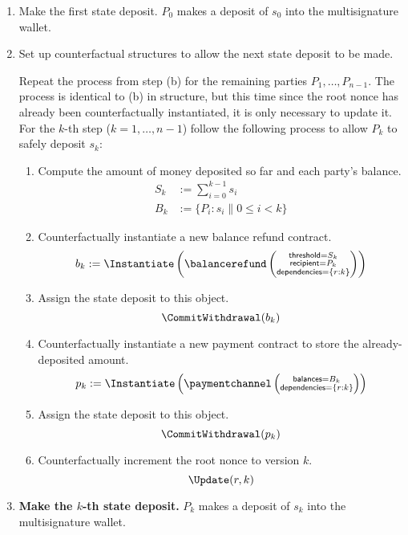 \documentclass[prb,floatfix,reprint,nofootinbib,amsmath,amssymb,epsfig,pre,floats,letterpaper,groupedaffiliation,tightenlines,allcolors=blue,11pt]{revtex4}
\theoremstyle{definition}
\theoremstyle{definition}
\theoremstyle{definition}
\begin{document}
\begin{enumerate}
\item Make the first state deposit.
$P_0$ makes a deposit of $s_0$ into the multisignature wallet.

\item Set up counterfactual structures to allow the next state deposit to be made.

Repeat the process from step (b) for the remaining parties $P_1,\hdots,P_{n-1}$. The process is identical to (b) in structure, but this time since the root nonce has already been counterfactually instantiated, it is only necessary to update it. For the $k$-th step ($k = 1,\ldots,n-1$) follow the following process to allow $P_k$ to safely deposit $s_k$:

\begin{enumerate}

\item Compute the amount of money deposited so far and each party's balance.
\begin{align*}
S_k &:= \sum_{i=0}^{k-1} s_i \\
B_k &:= \{P_i:s_i \| 0 \le i < k\}
\end{align*}

\item Counterfactually instantiate a new balance refund contract.
\[
b_k := \Instantiate\left(
\balancerefund\left(\substack{
    \textsf{threshold}=S_k \\
    \textsf{recipient}=P_k \\
    \textsf{dependencies}=\{r:k\}
    }\right)
    \right)
\]
\item Assign the state deposit to this object.
\[
\CommitWithdrawal(b_k)
\]

\item Counterfactually instantiate a new payment contract to store the already-deposited amount.
\[
    p_k := \Instantiate\left(
    \paymentchannel\left(\substack{
    \textsf{balances}=B_k \\
    \textsf{dependencies}=\left\{r:k\right\}
    }\right)
    \right)
\]

\item Assign the state deposit to this object.
\[
\CommitWithdrawal(p_k)
\]

\item Counterfactually increment the root nonce to version $k$.
\[
\Update(r, k)
\]

\end{enumerate}

\item \textbf{Make the $k$-th state deposit.}
$P_k$ makes a deposit of $s_k$ into the multisignature wallet.


\end{enumerate}
\end{document}
